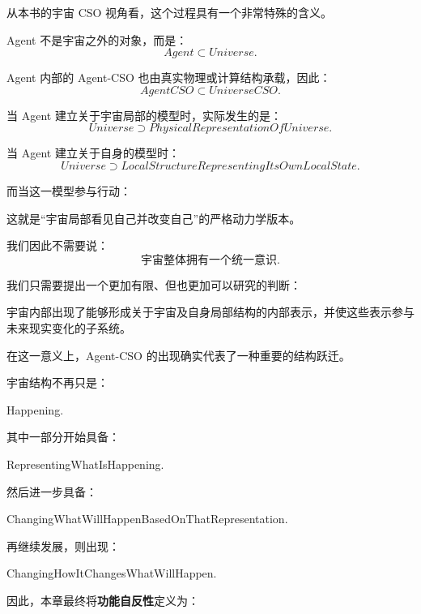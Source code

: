 从本书的宇宙 CSO 视角看，这个过程具有一个非常特殊的含义。

Agent 不是宇宙之外的对象，而是：
\[
Agent\subset Universe.
\]

Agent 内部的 Agent-CSO 也由真实物理或计算结构承载，因此：
\[
AgentCSO
\subset UniverseCSO.
\]

当 Agent 建立关于宇宙局部的模型时，实际发生的是：
\[
\boxed{
Universe
\supset
PhysicalRepresentationOfUniverse.
}
\]

当 Agent 建立关于自身的模型时：
\[
\boxed{
Universe
\supset
LocalStructureRepresentingItsOwnLocalState.
}
\]

而当这一模型参与行动：
\begin{statementbox}
\centering
{}
\end{statementbox}

这就是“宇宙局部看见自己并改变自己”的严格动力学版本。

我们因此不需要说：
\[
\text{宇宙整体拥有一个统一意识}.
\]

我们只需要提出一个更加有限、但也更加可以研究的判断：

\begin{statementbox}
宇宙内部出现了能够形成关于宇宙及自身局部结构的内部表示，并使这些表示参与未来现实变化的子系统。
\end{statementbox}

在这一意义上，Agent-CSO 的出现确实代表了一种重要的结构跃迁。

宇宙结构不再只是：
\begin{statementbox}
Happening.
\end{statementbox}

其中一部分开始具备：
\begin{statementbox}
RepresentingWhatIsHappening.
\end{statementbox}

然后进一步具备：
\begin{statementbox}
ChangingWhatWillHappenBasedOnThatRepresentation.
\end{statementbox}

再继续发展，则出现：
\begin{statementbox}
ChangingHowItChangesWhatWillHappen.
\end{statementbox}

因此，本章最终将\textbf{功能自反性}定义为：

